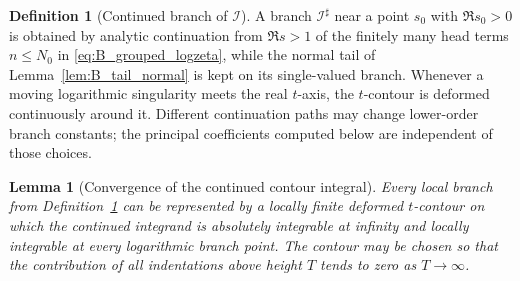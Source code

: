 \documentclass[11pt]{amsart}
\numberwithin{equation}{section}
\theoremstyle{plain}
\newtheorem{lemma}[theorem]{Lemma}
\theoremstyle{definition}
\newtheorem{definition}[theorem]{Definition}
\theoremstyle{remark}
\begin{document}
\begin{definition}[Continued branch of \(\mathcal I\)]
\label{def:I_sharp}
A branch \(\mathcal I^\sharp\) near a point \(s_0\) with \(\Re s_0>0\) is
obtained by analytic continuation from \(\Re s>1\) of the finitely many
head terms \(n\le N_0\) in \eqref{eq:B_grouped_logzeta}, while the normal
tail of Lemma~\ref{lem:B_tail_normal} is kept on its single-valued branch.
Whenever a moving logarithmic singularity meets the real \(t\)-axis, the
\(t\)-contour is deformed continuously around it.  Different continuation
paths may change lower-order branch constants; the principal coefficients
computed below are independent of those choices.
\end{definition}

\begin{lemma}[Convergence of the continued contour integral]
\label{lem:I_contour_convergence}
Every local branch from Definition~\ref{def:I_sharp} can be represented by a
locally finite deformed \(t\)-contour on which the continued integrand is
absolutely integrable at infinity and locally integrable at every logarithmic
branch point.  The contour may be chosen so that the contribution of all
indentations above height \(T\) tends to zero as \(T\to\infty\).
\end{lemma}
\end{document}
